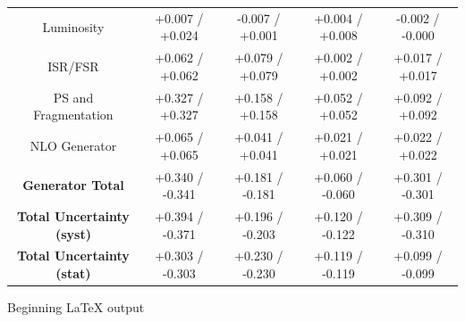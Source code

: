 \begin{table}[htbp]
\begin{center}
\begin{tabular}{|c|c|c|c|c|}
   Luminosity                            &  +0.007   / +0.024   & -0.007   / +0.001   & +0.004   / +0.008   & -0.002   / -0.000   \\
   ISR/FSR                               &  +0.062   / +0.062   & +0.079   / +0.079   & +0.002   / +0.002   & +0.017   / +0.017   \\
   PS and Fragmentation                  &  +0.327   / +0.327   & +0.158   / +0.158   & +0.052   / +0.052   & +0.092   / +0.092   \\
   NLO Generator                         &  +0.065   / +0.065   & +0.041   / +0.041   & +0.021   / +0.021   & +0.022   / +0.022   \\
   \hline
   \textbf{Generator Total}              &  +0.340   / -0.341   & +0.181   / -0.181   & +0.060   / -0.060   & +0.301   / -0.301   \\
   \hline
   \hline
   \textbf{Total Uncertainty (syst)}     &  +0.394   / -0.371   & +0.196   / -0.203   & +0.120   / -0.122   & +0.309   / -0.310   \\
   \textbf{Total Uncertainty (stat)}     &  +0.303   / -0.303   & +0.230   / -0.230   & +0.119   / -0.119   & +0.099   / -0.099   \\
   \hline
   \end{tabular}
 
   \end{center}
 \end{table}

 Beginning LaTeX output
 
